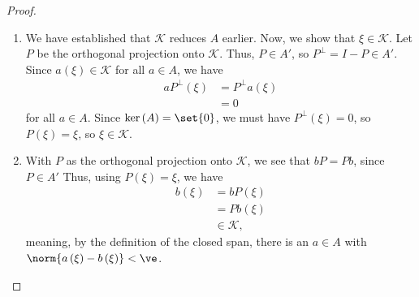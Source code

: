 \documentclass[10pt]{mypackage}
\begin{document}
\begin{proof}\hfill
  \begin{enumerate}[(1)]
    \item We have established that $\mathcal{K}$ reduces $A$ earlier. Now, we show that $\xi\in \mathcal{K}$. Let $P$ be the orthogonal projection onto $\mathcal{K}$. Thus, $P\in A'$, so $P^{\perp} = I-P \in A'$. Since $a\left(\xi\right) \in \mathcal{K}$ for all $a\in A$, we have
      \begin{align*}
        aP^{\perp}\left(\xi\right) &= P^{\perp}a\left(\xi\right)\\
                                   &= 0
      \end{align*}
      for all $a\in A$. Since $\ker\left(A\right) = \set{0}$, we must have $P^{\perp}\left(\xi\right) = 0$, so $P\left(\xi\right) = \xi$, so $\xi\in \mathcal{K}$.
    \item With $P$ as the orthogonal projection onto $\mathcal{K}$, we see that $bP = Pb$, since $P\in A'$ Thus, using $P\left(\xi\right) = \xi$, we have
      \begin{align*}
        b\left(\xi\right)&= bP\left(\xi\right)\\
                         &= Pb\left(\xi\right)\\
                         &\in \mathcal{K},
      \end{align*}
      meaning, by the definition of the closed span, there is an $a\in A$ with $\norm{a\left(\xi\right) - b\left(\xi\right)} < \ve$.
  \end{enumerate}
\end{proof}
\end{document}
